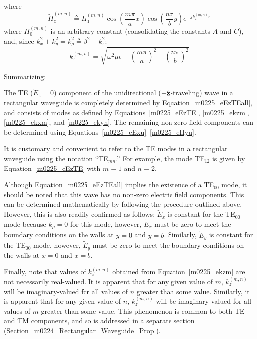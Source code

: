 %
where
\begin{equation}
\widetilde{H}_z^{(m,n)} \triangleq H_0^{(m,n)} \cos\left(\frac{m\pi}{a} x\right) \cos\left(\frac{n\pi}{b} y\right) e^{-jk_z^{(m,n)} z} \label{m0225_eEzTE}
\end{equation}
%
where 
$H_0^{(m,n)}$ is an arbitrary constant (consolidating the constants $A$ and $C$),  
and, since $k_x^2 + k_y^2 = k_{\rho}^2 \triangleq \beta^2-k_z^2$:
% 
\begin{equation}
k_z^{(m,n)} = \sqrt{ \omega^2\mu\epsilon - \left(\frac{m\pi}{a}\right)^2 - \left(\frac{n\pi}{b}\right)^2   } \label{m0225_ekzm}
\end{equation}

Summarizing:
%
\begin{mdframed}[backgroundcolor=yellow!20,nobreak=true] 
The TE ($\widetilde{E}_z=0$) component of the unidirectional ($+\hat{\bf z}$-traveling) wave in a rectangular waveguide is completely determined by Equation~\ref{m0225_eEzTEall}, and consists of modes as defined by Equations~\ref{m0225_eEzTE}, \ref{m0225_ekzm}, \ref{m0225_ekxm}, and \ref{m0225_ekyn}.  The remaining non-zero field components can be determined using Equations~\ref{m0225_eExu}--\ref{m0225_eHyu}.
\end{mdframed}

It is customary and convenient to refer to the TE modes in a rectangular waveguide using the notation ``TE$_{mn}$.''
For example, the mode TE$_{12}$ is given by Equation~\ref {m0225_eEzTE} with $m=1$ and $n=2$.

Although Equation~\ref{m0225_eEzTEall} implies the existence of a TE$_{00}$ mode, it should be noted that this wave has no non-zero electric field components.
This can be determined mathematically by following the procedure outlined above.
However, this is also readily confirmed as follows:
$\widetilde{E}_x$ is constant for the TE$_{00}$ mode because $k_{\rho}=0$ for this mode, however, $\widetilde{E}_x$ must be zero to meet the boundary conditions on the walls at $y=0$ and $y=b$.
Similarly,
$\widetilde{E}_y$ is constant for the TE$_{00}$ mode, however, $\widetilde{E}_y$ must be zero to meet the boundary conditions on the walls at $x=0$ and $x=b$.

Finally, note that values of $k_z^{(m,n)}$ obtained from Equation~\ref{m0225_ekzm} are not necessarily real-valued.  
It is apparent that for any given value of $m$, $k_z^{(m,n)}$ will be imaginary-valued for all values of $n$ greater than some value.
Similarly, 
it is apparent that for any given value of $n$, $k_z^{(m,n)}$ will be imaginary-valued for all values of $m$ greater than some value.
This phenomenon is common to both TE and TM components, and so is addressed in a separate section (Section~\ref{m0224_Rectangular_Waveguide_Prop}).

